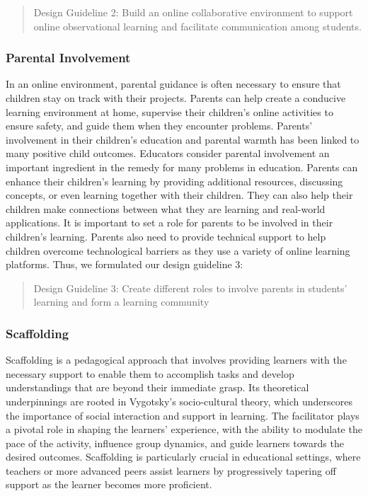 \begin{quote}
  Design Guideline 2: Build an online collaborative environment to support online observational learning and facilitate communication among students.
\end{quote}

\subsubsection{Parental Involvement}
In an online environment, parental guidance is often necessary to ensure that children stay on track with their projects. Parents can help create a conducive learning environment at home, supervise their children's online activities to ensure safety, and guide them when they encounter problems. Parents' involvement in their children's education and parental warmth has been linked to many positive child outcomes\citep{ogg2020process}. Educators consider parental involvement an important ingredient in the remedy for many problems in education. Parents can enhance their children's learning by providing additional resources, discussing concepts, or even learning together with their children. They can also help their children make connections between what they are learning and real-world applications. It is important to set a role for parents to be involved in their children's learning. Parents also need to provide technical support to help children overcome technological barriers as they use a variety of online learning platforms\citep{cumbo2021exploring,anastasiades2008collaborative}. Thus, we formulated our design guideline 3:
  
\begin{quote}  
  Design Guideline 3: Create different roles to involve parents in students' learning and form a learning community
\end{quote}
  
\subsubsection{Scaffolding}
Scaffolding is a pedagogical approach that involves providing learners with the necessary support to enable them to accomplish tasks and develop understandings that are beyond their immediate grasp\citep{hammond2005scaffolding}. Its theoretical underpinnings are rooted in Vygotsky’s socio-cultural theory\citep{hammond2005scaffolding}, which underscores the importance of social interaction and support in learning\citep{hourcade2008interaction}. The facilitator plays a pivotal role in shaping the learners’ experience, with the ability to modulate the pace of the activity, influence group dynamics, and guide learners towards the desired outcomes. Scaffolding is particularly crucial in educational settings, where teachers or more advanced peers assist learners by progressively tapering off support as the learner becomes more proficient. 


